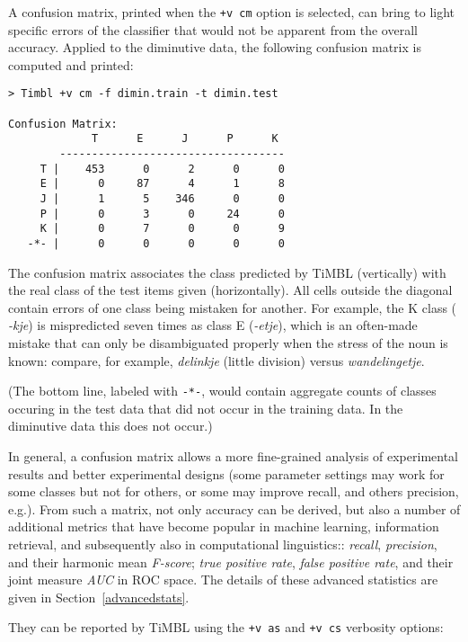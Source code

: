 \documentclass{report}
\begin{document}
A confusion matrix, printed when the {\tt +v cm} option is selected,
can bring to light specific errors of the classifier that would not be
apparent from the overall accuracy. Applied to the diminutive data,
the following confusion matrix is computed and printed:

{\footnotesize
\begin{verbatim}
> Timbl +v cm -f dimin.train -t dimin.test

Confusion Matrix:
             T      E      J      P      K 
        -----------------------------------
     T |    453      0      2      0      0 
     E |      0     87      4      1      8 
     J |      1      5    346      0      0 
     P |      0      3      0     24      0 
     K |      0      7      0      0      9 
   -*- |      0      0      0      0      0 
\end{verbatim}
}

The confusion matrix associates the class predicted by TiMBL
(vertically) with the real class of the test items given
(horizontally). All cells outside the diagonal contain errors of one
class being mistaken for another. For example, the K class ({\em
  -kje}) is mispredicted seven times as class E ({\em -etje}), which
is an often-made mistake that can only be disambiguated properly when
the stress of the noun is known: compare, for example, {\em delinkje}\/
(little division) versus {\em wandelingetje}.

(The bottom line, labeled with {\tt -*-}, would contain aggregate
counts of classes occuring in the test data that did not occur in the
training data. In the diminutive data this does not occur.)

In general, a confusion matrix allows a more fine-grained analysis of
experimental results and better experimental designs (some parameter
settings may work for some classes but not for others, or some may
improve recall, and others precision, e.g.). From such a matrix, not
only accuracy can be derived, but also a number of additional metrics
that have become popular in machine learning, information retrieval,
and subsequently also in computational linguistics:: {\em recall},
{\em precision}, and their harmonic mean {\em F-score}; {\em true
  positive rate}, {\em false positive rate}, and their joint measure
{\em AUC} in ROC space.  The details of these advanced statistics are
given in Section~\ref{advancedstats}.

They can be reported by TiMBL using the {\tt +v as} and {\tt +v cs}
verbosity options:
\end{document}

